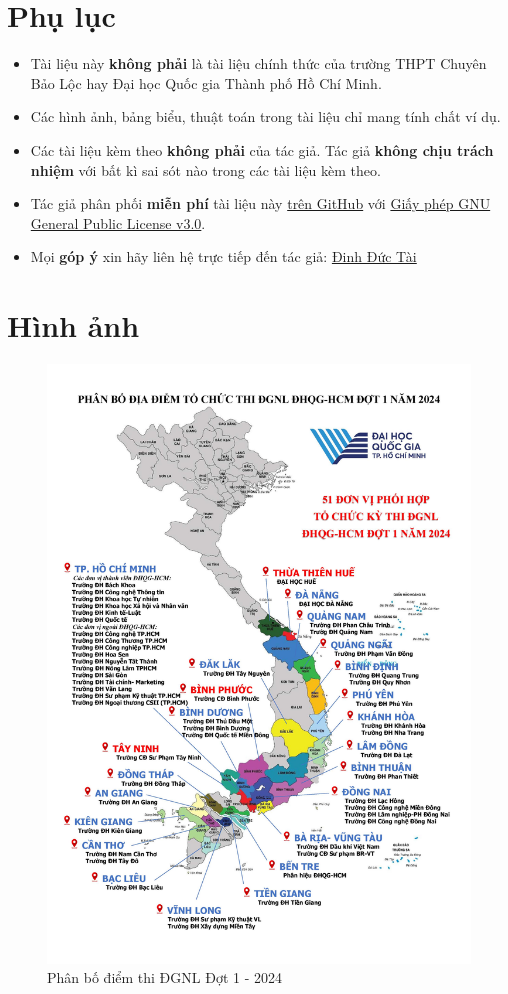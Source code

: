 \section{Phụ lục}
\begin{itemize}
\item Tài liệu này \textbf{không phải} là tài liệu chính thức của trường THPT Chuyên Bảo Lộc hay Đại học Quốc gia Thành phố Hồ Chí Minh.
\item Các hình ảnh, bảng biểu, thuật toán trong tài liệu chỉ mang tính chất ví dụ.
\item Các tài liệu kèm theo \textbf{không phải} của tác giả. Tác giả \textbf{không chịu trách nhiệm} với bất kì sai sót nào trong các tài liệu kèm theo.
\item Tác giả phân phối \textbf{miễn phí} tài liệu này \href{https://github.com/ductai05/DGNL_2024}{trên GitHub} với \href{https://github.com/ductai05/DGNL_2024/blob/main/LICENSE}{Giấy phép GNU General Public License v3.0}. 
\item Mọi \textbf{góp ý} xin hãy liên hệ trực tiếp đến tác giả: \href{https://facebook.com/ductai05}{Đinh Đức Tài}
\end{itemize}
\section{Hình ảnh}
\begin{figure}
    \centering
    \includegraphics[width=1\linewidth]{img/Phan-bo-diem-thi-DGNL-Dot-1-2024.jpg}
    \caption{Phân bố điểm thi ĐGNL Đợt 1 - 2024}
    \label{fig:phanbodiemthi_dot1}
\end{figure}

